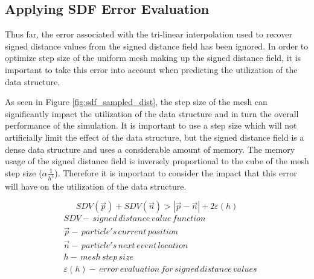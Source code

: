 
\subsection{Applying SDF Error Evaluation}

Thus far, the error associated with the tri-linear interpolation used to recover
signed distance values from the signed distance field has been ignored. In
order to optimize step size of the uniform mesh making up the signed distance
field, it is important to take this error into account when predicting the
utilization of the data structure.

As seen in Figure \ref{fig:sdf_sampled_dist}, the step size of the mesh can
significantly impact the utilization of the data structure and in turn the
overall performance of the simulation. It is important to use a step size which
will not artificially limit the effect of the data structure, but the signed
distance field is a dense data structure and uses a considerable amount of
memory. The memory usage of the signed distance field is inversely proportional
to the cube of the mesh step size ($\alpha \frac{1}{h^{3}}$). Therefore it is
important to consider the impact that this error will have on the utilization
of the data structure.

\begin{equation}
  SDV(\vec{p}) + SDV(\vec{n}) > |\vec{p}-\vec{n}| + 2\varepsilon(h)
  \label{eq:condition}
\end{equation}
\begin{align*}
 &SDV - \, signed \, distance \, value \, function \\
 &\vec{p} - \, particle's \, current \, position \\
 &\vec{n} - \, particle's \, next \, event \, location \\
 &h - \, mesh \, step \, size \\
 &\varepsilon(h) - \, error \, evaluation \, for \, signed \, distance \, values \\
\end{align*}


